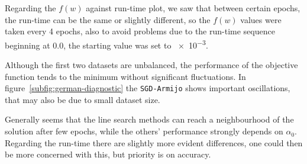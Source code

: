 Regarding the $f(w)$ against run-time plot, we saw that between certain epochs, the run-time can be the same or slightly different, so the $f(w)$ values were taken every 4 epochs, also to avoid problems due to the run-time sequence beginning at \num{0.0}, the starting value was set to \num{e-3}.\par\smallskip




Although the first two datasets are unbalanced, the performance of the objective function tends to the minimum without significant fluctuations. In figure~\ref{subfig:german-diagnostic} the \texttt{SGD-Armijo} shows important oscillations, that may also be due to small dataset size.


Generally seems that the line search methods can reach a neighbourhood of the solution after few epochs, while the others' performance strongly depends on $\alpha_0$. Regarding the run-time there are slightly more evident differences, one could then be more concerned with this, but priority is on accuracy.

